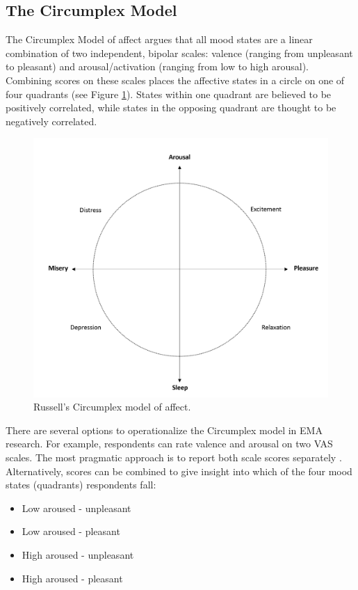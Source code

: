 \documentclass[]{book}
\providecommand{\tightlist}{%
  \setlength{\itemsep}{0pt}\setlength{\parskip}{0pt}}
\begin{document}
\subsection{The Circumplex Model}\label{the-circumplex-model}


The Circumplex Model of affect \citep{russell1980circumplex, Posner2005}
argues that all mood states are a linear combination of two independent,
bipolar scales: valence (ranging from unpleasant to pleasant) and
arousal/activation (ranging from low to high arousal). Combining scores
on these scales places the affective states in a circle on one of four
quadrants (see Figure \ref{fig:circumplexrussel}). States within one
quadrant are believed to be positively correlated, while states in the
opposing quadrant are thought to be negatively correlated.

\begin{figure}

{\centering \includegraphics[width=0.6\linewidth]{images/outcomes/Russell1980} 

}

\caption{Russell's Circumplex model of affect.}\label{fig:circumplexrussel}
\end{figure}

There are several options to operationalize the Circumplex model in EMA
research. For example, respondents can rate valence and arousal on two
VAS scales. The most pragmatic approach is to report both scale scores
separately \citep{Asselbergs2016}. Alternatively, scores can be combined
to give insight into which of the four mood states (quadrants)
respondents fall:

\begin{itemize}
\tightlist
\item
  Low aroused - unpleasant
\item
  Low aroused - pleasant
\item
  High aroused - unpleasant
\item
  High aroused - pleasant
\end{itemize}
\end{document}
